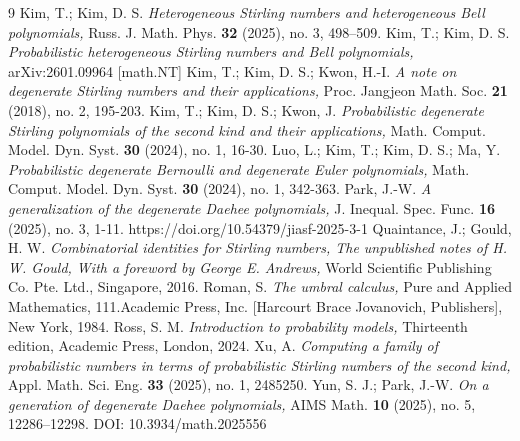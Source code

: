 \documentclass[a4paper,11pt]{amsart}
\begin{document}
\begin{thebibliography}{9}
Kim, T.; Kim, D. S. \emph{Heterogeneous Stirling numbers and heterogeneous Bell polynomials,} Russ. J. Math. Phys. \textbf{32} (2025), no. 3, 498–509.
Kim, T.; Kim, D. S. \emph{Probabilistic heterogeneous Stirling numbers and Bell polynomials,} arXiv:2601.09964 [math.NT]
Kim, T.; Kim, D. S.; Kwon, H.-I. \emph{A note on degenerate Stirling numbers and their applications,} Proc. Jangjeon Math. Soc. \textbf{21} (2018), no. 2, 195-203.
Kim, T.; Kim, D. S.; Kwon, J. \emph{Probabilistic degenerate Stirling polynomials of the second kind and their applications,} Math. Comput. Model. Dyn. Syst. \textbf{30} (2024), no. 1, 16-30.
Luo, L.; Kim, T.; Kim, D. S.; Ma, Y. \emph{Probabilistic degenerate Bernoulli and degenerate Euler polynomials,} Math. Comput. Model. Dyn. Syst. \textbf{30} (2024), no. 1, 342-363.
Park, J.-W. \emph{A generalization of the degenerate Daehee polynomials,} J. Inequal. Spec. Func. \textbf{16} (2025), no. 3, 1-11. https://doi.org/10.54379/jiasf-2025-3-1
Quaintance, J.; Gould, H. W. \emph{Combinatorial identities for Stirling numbers, The unpublished  notes of H. W. Gould, With a foreword by George E. Andrews,} World Scientific Publishing Co. Pte. Ltd., Singapore, 2016.
Roman, S. \emph{The umbral calculus,} Pure and Applied Mathematics, 111.Academic Press, Inc. [Harcourt Brace Jovanovich, Publishers], New York, 1984. 
Ross, S. M. \emph{Introduction to probability models,} Thirteenth edition, Academic Press, London, 2024. 
Xu, A. \emph{Computing a family of probabilistic numbers in terms of probabilistic Stirling numbers of the second kind,} Appl. Math. Sci. Eng. \textbf{33} (2025), no. 1, 2485250.
Yun, S. J.; Park, J.-W. \emph{On a generation of degenerate Daehee polynomials,} AIMS Math. \textbf{10} (2025), no. 5, 12286–12298. DOI: 10.3934/math.2025556























\end{thebibliography}
\end{document}
